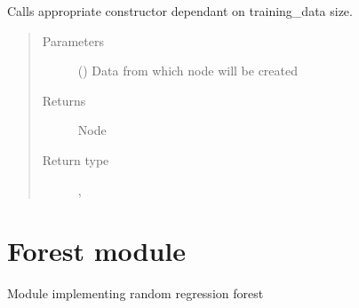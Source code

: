 \documentclass[letterpaper,10pt,english]{sphinxmanual}
\begin{document}

\begin{fulllineitems}
\label{\detokenize{tree:random_forest.tree.create_node}}
Calls appropriate constructor dependant on training\_data size.
\begin{quote}\begin{description}
\item[{Parameters}] \leavevmode
{} () \textendash{} Data from which node will be created

\item[{Returns}] \leavevmode
Node

\item[{Return type}] \leavevmode
{\hyperref[\detokenize{tree:random_forest.tree.Node}]{}}, {\hyperref[\detokenize{tree:random_forest.tree.Leaf}]{}}

\end{description}\end{quote}

\end{fulllineitems}

\label{\detokenize{forest:module-random_forest.forest}}

\chapter{Forest module}
\label{\detokenize{forest:forest-module}}\label{\detokenize{forest::doc}}
Module implementing random regression forest
\end{document}

